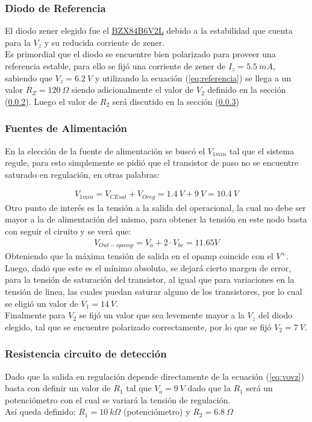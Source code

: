 \subsubsection{Diodo de Referencia}
El diodo zener elegido fue el \href{https://d1d2qsbl8m0m72.cloudfront.net/en/products/databook/datasheet/discrete/diode/zener/bzx84b6v2lt116-e.pdf}{BZX84B6V2L}
debido a la estabilidad que cuenta para la $V_z$ y su reducida corriente de zener.\\
Es primordial que el diodo se encuentre bien polarizado para proveer una referencia estable, para ello se fijó una corriente de zener de $I_z =5.5 \ mA$, sabiendo que $V_z=6.2 \ V$  y utilizando la ecuación (\ref{eq:referencia}) se llega a un valor $R_Z=120 \ \Omega$ siendo adicionalmente el valor de $V_2$ definido en la sección (\ref{sec:fuentes}).
Luego el valor de $R_2$ será discutido en la sección (\ref{sec:resdet})
\subsubsection{Fuentes de Alimentación}
\label{sec:fuentes}
En la elección de la fuente de alimentación se buscó el $V_{1min}$ tal que el sistema regule, para esto simplemente se pidió que el transistor de paso no se encuentre saturado en regulación, en otras palabras:

\begin{align}
V_{1min}=V_{CEsat}+V_{Oreg}= 1.4 \ V+9 \ V=10.4 \ V
\end{align}
Otro punto de interés es la tensión a la salida del operacional, la cual no debe ser mayor a la de alimentación del mismo, para obtener la tensión en este nodo basta con seguir el ciruito y se verá que:
\begin{align}
V_{Out-opamp}= V_o+2\cdot V_{be} = 11.65V
\end{align}
Obteniendo que la máxima tensión de salida en el opamp coincide con el $V^+$.\\
Luego, dado que este es el mínimo absoluto, se dejará cierto margen de error, para la tensión de saturación del transistor, al igual que para variaciones en la tensión de linea, las cuales puedan saturar alguno de los transistores, por lo cual se eligió un valor de $V_1=14 \ V$.\\
Finalmente para $V_2$ se fijó un valor que sea levemente mayor a la $V_z$ del diodo elegido, tal que se encuentre polarizado correctamente, por lo que se fijó $V_2=7\ V$.

\subsubsection{Resistencia circuito de detección}
\label{sec:resdet}
Dado que la salida en regulación depende directamente de la ecuación (\ref{eq:vovz}) basta con definir un valor de $R_1$ tal que $V_o=9 \ V$ dado que la $R_1$ será un potenciómetro con el cual se variará la tensión de regulación.\\ Así queda definido: $R_1= 10 \ k\Omega$ (potenciómetro) y $R_2=6.8  \  \Omega$
